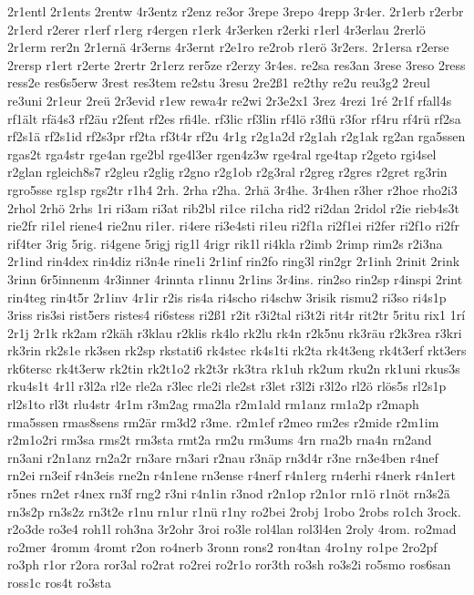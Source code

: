{2r1entl
2r1ents
2rentw
4r3entz
r2enz
re3or
3repe
3repo
4repp
3r4er.
2r1erb
r2erbr
2r1erd
r2erer
r1erf
r1erg
r4ergen
r1erk
4r3erken
r2erki
r1erl
4r3erlau
2rerlö
2r1erm
rer2n
2r1ernä
4r3erns
4r3ernt
r2e1ro
re2rob
r1erö
3r2ers.
2r1ersa
r2erse
2rersp
r1ert
r2erte
2rertr
2r1erz
rer5ze
r2erzy
3r4es.
re2sa
res3an
3rese
3reso
2ress
ress2e
res6s5erw
3rest
res3tem
re2stu
3resu
2re2ß1
re2thy
re2u
reu3g2
2reul
re3uni
2r1eur
2reü
2r3evid
r1ew
rewa4r
re2wi
2r3e2x1
3rez
4rezi
1ré
2r1f
rfall4s
rf1ält
rfä4s3
rf2äu
r2fent
rf2es
rfi4le.
rf3lic
rf3lin
rf4lö
r3flü
r3for
rf4ru
rf4rü
rf2sa
rf2s1ä
rf2s1id
rf2s3pr
rf2ta
rf3t4r
rf2u
4r1g
r2g1a2d
r2g1ah
r2g1ak
rg2an
rga5ssen
rgas2t
rga4str
rge4an
rge2bl
rge4l3er
rgen4z3w
rge4ral
rge4tap
r2geto
rgi4sel
r2glan
rgleich8s7
r2gleu
r2glig
r2gno
r2g1ob
r2g3ral
r2greg
r2gres
r2gret
rg3rin
rgro5sse
rg1sp
rgs2tr
r1h4
2rh.
2rha
r2ha.
2rhä
3r4he.
3r4hen
r3her
r2hoe
rho2i3
2rhol
2rhö
2rhs
1ri
ri3am
ri3at
rib2bl
ri1ce
ri1cha
rid2
ri2dan
2ridol
r2ie
rieb4s3t
rie2fr
ri1el
riene4
rie2nu
ri1er.
ri4ere
ri3e4sti
ri1eu
ri2f1a
ri2f1ei
ri2fer
ri2f1o
ri2fr
rif4ter
3rig
5rig.
ri4gene
5rigj
rig1l
4rigr
rik1l
ri4kla
r2imb
2rimp
rim2s
r2i3na
2r1ind
rin4dex
rin4diz
ri3n4e
rine1i
2r1inf
rin2fo
ring3l
rin2gr
2r1inh
2rinit
2rink
3rinn
6r5innenm
4r3inner
4rinnta
r1innu
2r1ins
3r4ins.
rin2so
rin2sp
r4inspi
2rint
rin4teg
rin4t5r
2r1inv
4r1ir
r2is
ris4a
ri4scho
ri4schw
3risik
rismu2
ri3so
ri4s1p
3riss
ris3si
rist5ers
ristes4
ri6stess
ri2ß1
r2it
r3i2tal
ri3t2i
rit4r
rit2tr
5ritu
rix1
1rí
2r1j
2r1k
rk2am
r2käh
r3klau
r2klis
rk4lo
rk2lu
rk4n
r2k5nu
rk3räu
r2k3rea
r3kri
rk3rin
rk2s1e
rk3sen
rk2sp
rkstati6
rk4stec
rk4s1ti
rk2ta
rk4t3eng
rk4t3erf
rkt3ers
rk6tersc
rk4t3erw
rk2tin
rk2t1o2
rk2t3r
rk3tra
rk1uh
rk2um
rku2n
rk1uni
rkus3s
rku4s1t
4r1l
r3l2a
rl2e
rle2a
r3lec
rle2i
rle2st
r3let
r3l2i
r3l2o
rl2ö
rlös5s
rl2s1p
rl2s1to
rl3t
rlu4str
4r1m
r3m2ag
rma2la
r2m1ald
rm1anz
rm1a2p
r2maph
rma5ssen
rmas8sens
rm2är
rm3d2
r3me.
r2m1ef
r2meo
rm2es
r2mide
r2m1im
r2m1o2ri
rm3sa
rms2t
rm3sta
rmt2a
rm2u
rm3ums
4rn
rna2b
rna4n
rn2and
rn3ani
r2n1anz
rn2a2r
rn3are
rn3ari
r2nau
r3näp
rn3d4r
r3ne
rn3e4ben
r4nef
rn2ei
rn3eif
r4n3eis
rne2n
r4n1ene
rn3ense
r4nerf
r4n1erg
rn4erhi
r4nerk
r4n1ert
r5nes
rn2et
r4nex
rn3f
rng2
r3ni
r4n1in
r3nod
r2n1op
r2n1or
rn1ö
r1nöt
rn3s2ä
rn3s2p
rn3s2z
rn3t2e
r1nu
rn1ur
r1nü
r1ny
ro2bei
2robj
1robo
2robs
ro1ch
3rock.
r2o3de
ro3e4
roh1l
roh3na
3r2ohr
3roi
ro3le
rol4lan
rol3l4en
2roly
4rom.
ro2mad
ro2mer
4romm
4romt
r2on
ro4nerb
3ronn
rons2
ron4tan
4ro1ny
ro1pe
2ro2pf
ro3ph
r1or
r2ora
ror3al
ro2rat
ro2rei
ro2r1o
ror3th
ro3sh
ro3s2i
ro5smo
ros6san
ross1c
ros4t
ro3sta
}
